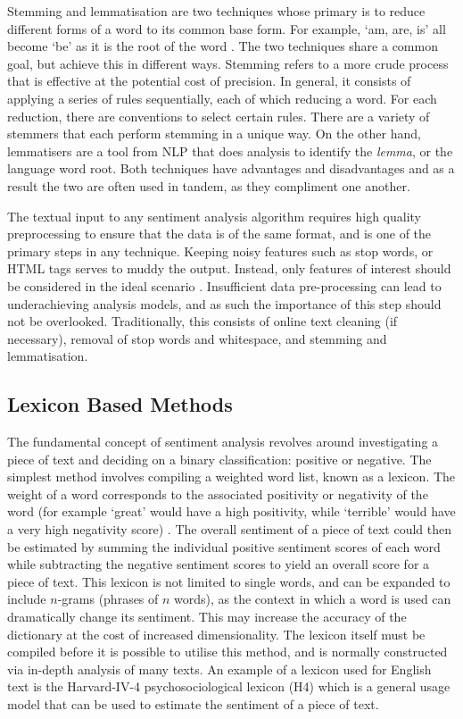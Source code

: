 Stemming and lemmatisation are two techniques whose primary is to reduce different forms of a word to its common base form. For example, `am, are, is' all become `be' as it is the root of the word \parencite{stem-lem}. The two techniques share a common goal, but achieve this in different ways. Stemming refers to a more crude process that is effective at the potential cost of precision. In general, it consists of applying a series of rules sequentially, each of which reducing a word. For each reduction, there are conventions to select certain rules. There are a variety of stemmers that each perform stemming in a unique way. On the other hand, lemmatisers are a tool from NLP that does analysis to identify the \textit{lemma}, or the language word root. Both techniques have advantages and disadvantages and as a result the two are often used in tandem, as they compliment one another.

The textual input to any sentiment analysis algorithm requires high quality preprocessing to ensure that the data is of the same format, and is one of the primary steps in any technique. Keeping noisy features such as stop words, or HTML tags serves to muddy the output. Instead, only features of interest should be considered in the ideal scenario \parencite{haddi2013preprocessing}. Insufficient data pre-processing can lead to underachieving analysis models, and as such the importance of this step should not be overlooked. Traditionally, this consists of online text cleaning (if necessary), removal of stop words and whitespace, and stemming and lemmatisation.

\subsection{Lexicon Based Methods}
The fundamental concept of sentiment analysis revolves around investigating a piece of text and deciding on a binary classification: positive or negative. The simplest method involves compiling a weighted word list, known as a lexicon. The weight of a word corresponds to the associated positivity or negativity of the word (for example `great' would have a high positivity, while `terrible' would have a very high negativity score) \parencite{taboada2011lexicon}. The overall sentiment of a piece of text could then be estimated by summing the individual positive sentiment scores of each word while subtracting the negative sentiment scores to yield an overall score for a piece of text. This lexicon is not limited to single words, and can be expanded to include $n$-grams (phrases of $n$ words), as the context in which a word is used can dramatically change its sentiment. This may increase the accuracy of the dictionary at the cost of increased dimensionality. The lexicon itself must be compiled before it is possible to utilise this method, and is normally constructed via in-depth analysis of many texts. An example of a lexicon used for English text is the Harvard-IV-4 psychosociological lexicon (H4) which is a general usage model that can be used to estimate the sentiment of a piece of text.

